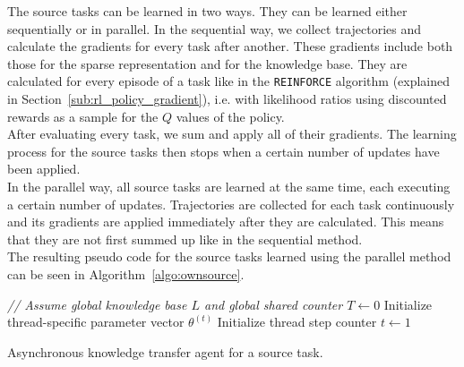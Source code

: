 \documentclass[a4paper, 11pt]{article}
\begin{document}
The source tasks can be learned in two ways. They can be learned either sequentially or in parallel.
In the sequential way, we collect trajectories and calculate the gradients for every task after another. These gradients include both those for the sparse representation and for the knowledge base. They are calculated for every episode of a task like in the \texttt{REINFORCE} algorithm (explained in Section~\ref{sub:rl_policy_gradient}), i.e. with likelihood ratios using discounted rewards as a sample for the $Q$ values of the policy.\\
After evaluating every task, we sum and apply all of their gradients. The learning process for the source tasks then stops when a certain number of updates have been applied.\\
In the parallel way, all source tasks are learned at the same time, each executing a certain number of updates. Trajectories are collected for each task continuously and its gradients are applied immediately after they are calculated. This means that they are not first summed up like in the sequential method.\\
The resulting pseudo code for the source tasks learned using the parallel method can be seen in Algorithm~\ref{algo:ownsource}.\\
\begin{algorithm}[htb]
\DontPrintSemicolon
\emph{// Assume global knowledge base $L$ and global shared counter $T \gets 0$}\;
Initialize thread-specific parameter vector $\theta^{(t)}$\;
Initialize thread step counter $t\gets 1$\;
\caption[Asynchronous knowledge transfer agent for a source task]{Asynchronous knowledge transfer agent for a source task.}
\label{algo:ownsource}
\end{algorithm}
\end{document}
